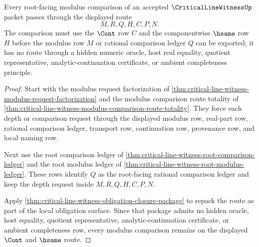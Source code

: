 \begin{theorem}
\label{thm:critical-line-witness-root-modulus-route-row}
Every root-facing modulus comparison of an accepted $\CriticalLineWitnessUp$ packet passes through the displayed route
$$
M,R,Q,H,C,P,N.
$$
The comparison must use the $\Cont$ row $C$ and the componentwise $\hsame$ row $H$ before the modulus row $M$ or rational comparison ledger $Q$ can be exported; it has no route through a hidden numeric oracle, host real equality, quotient representative, analytic-continuation certificate, or ambient completeness principle.
\end{theorem}
\begin{proof}
Start with the modulus request factorization of \autoref{thm:critical-line-witness-modulus-request-factorization} and the modulus comparison route totality of \autoref{thm:critical-line-witness-modulus-comparison-route-totality}. They force each depth or comparison request through the displayed modulus row, real-part row, rational comparison ledger, transport row, continuation row, provenance row, and local naming row.

Next use the root comparison ledger of \autoref{thm:critical-line-witness-root-comparison-ledger} and the root modulus ledger of \autoref{thm:critical-line-witness-root-modulus-ledger}. These rows identify $Q$ as the root-facing rational comparison ledger and keep the depth request inside $M,R,Q,H,C,P,N$.

Apply \autoref{thm:critical-line-witness-obligation-closure-package} to repack the route as part of the local obligation surface. Since that package admits no hidden oracle, host equality, quotient representative, analytic-continuation certificate, or ambient completeness row, every modulus comparison remains on the displayed $\Cont$ and $\hsame$ route.
\end{proof}


